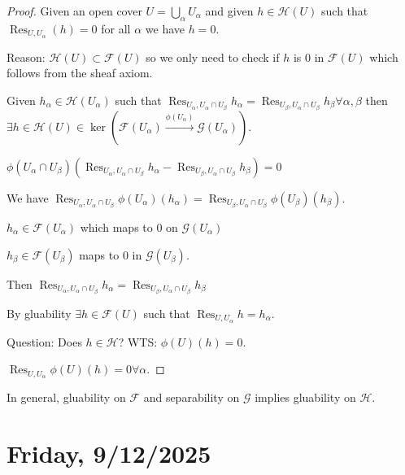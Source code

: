 \documentclass{article}
\theoremstyle{definition}
\begin{document}
    \begin{proof}
        Given an open cover \(U = \bigcup_{\alpha} U_\alpha\) and given \(h \in \mathcal{H} (U)\) such that \(\operatorname{Res}_{U,U_\alpha}(h) = 0\) for all \(\alpha\) we have \(h = 0\).

        Reason: \(\mathcal{H}(U) \subset \mathcal{F}(U)\) so we only need to check if \(h\) is \(0\) in \(\mathcal{F}(U)\) which follows from the sheaf axiom.

        Given \(h_\alpha \in \mathcal{H}(U_\alpha)\) such that \(\operatorname{Res}_{U_\alpha , U_\alpha \cap U_\beta} h_\alpha = \operatorname{Res}_{{U_\beta , U_\alpha \cap U_\beta}} h_\beta \forall \alpha ,\beta \) then \(\exists h \in \mathcal{H}(U) \in \ker \left( \mathcal{F}(U_\alpha) \xrightarrow{\phi(U_\alpha)} \mathcal{G}(U_\alpha) \right)\).

        \(\phi(U_\alpha \cap U_\beta) \left( \operatorname{Res}_{U_\alpha , U_\alpha \cap U_\beta} h_\alpha - \operatorname{Res}_{U_\beta , U_\alpha \cap U_\beta} h_\beta \right) = 0\) 

        We have \(\operatorname{Res}_{U_\alpha , U_\alpha \cap U_\beta} \phi(U_\alpha)(h_\alpha) = \operatorname{Res}_{U_\beta , U_\alpha \cap U_\beta} \phi(U_\beta) (h_\beta)\).

        \(h_\alpha \in \mathcal{F}(U_\alpha)\) which maps to \(0\) on \(\mathcal{G}(U_\alpha)\) 

        \(h_\beta \in \mathcal{F}(U_\beta)\) maps to \(0\) in \(\mathcal{G}(U_\beta)\).

        Then \(\operatorname{Res}_{U_\alpha , U_\alpha \cap U_\beta} h_\alpha = \operatorname{Res}_{U_\beta , U_\alpha \cap U_\beta} h_\beta\) 

        By gluability \(\exists h \in \mathcal{F}(U)\) such that \(\operatorname{Res}_{U,U_\alpha} h = h_\alpha\).

        Question: Does \(h\in \mathcal{H}\)? WTS: \(\phi(U)(h) = 0\).
        
        \(\operatorname{Res}_{U,U_\alpha} \phi(U) (h) = 0 \forall \alpha\).

    \end{proof}

    In general, gluability on \(\mathcal{F}\) and separability on \(\mathcal{G}\) implies gluability on \(\mathcal{H}\).

    \section*{Friday, 9/12/2025}
    
\end{document}
